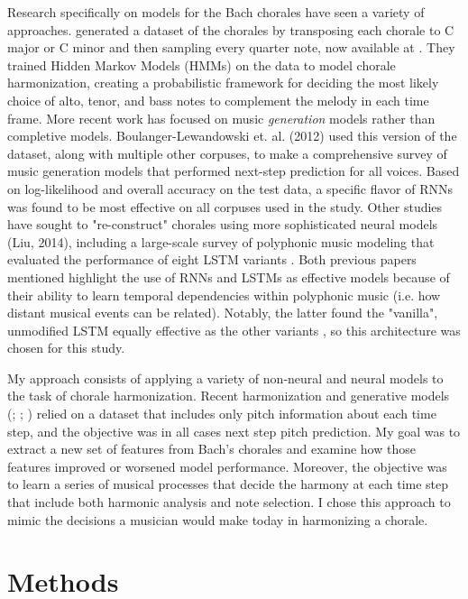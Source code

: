 \documentclass[11pt]{article}
\begin{document}
Research specifically on models for the Bach chorales have seen a variety of approaches. \citet{allan2005harmonising} generated a dataset of the chorales by transposing each chorale to C major or C minor and then sampling every quarter note, now available at \JSBChorales. They trained Hidden Markov Models (HMMs) on the data to model chorale harmonization, creating a probabilistic framework for deciding the most likely choice of alto, tenor, and bass notes to complement the melody in each time frame. More recent work has focused on music \textit{generation} models rather than completive models. Boulanger-Lewandowski et. al. (2012) used this version of the dataset, along with multiple other corpuses, to make a comprehensive survey of music generation models that performed next-step prediction for all voices. Based on log-likelihood and overall accuracy on the test data, a specific flavor of RNNs was found to be most effective on all corpuses used in the study. Other studies have sought to "re-construct" chorales using more sophisticated neural models (Liu, 2014), including a large-scale survey of polyphonic music modeling that evaluated the performance of eight LSTM variants \citet{greff2015lstm}. Both previous papers mentioned highlight the use of RNNs and LSTMs as effective models because of their ability to learn temporal dependencies within polyphonic music (i.e. how distant musical events can be related). Notably, the latter found the "vanilla", unmodified LSTM equally effective as the other variants \citep[p.~7]{greff2015lstm}, so this architecture was chosen for this study.

My approach consists of applying a variety of non-neural and neural models to the task of chorale harmonization. Recent harmonization and generative models (\cite{allan2005harmonising}; \cite{kaliakatsos2014}; \cite{greff2015lstm}) relied on a dataset that includes only pitch information about each time step, and the objective was in all cases next step pitch prediction. My goal was to extract a new set of features from Bach's chorales and examine how those features improved or worsened model performance. Moreover, the objective was to learn a series of musical processes that decide the harmony at each time step that include both harmonic analysis and note selection. I chose this approach to mimic the decisions a musician would make today in harmonizing a chorale.

\section{Methods}
\end{document}
